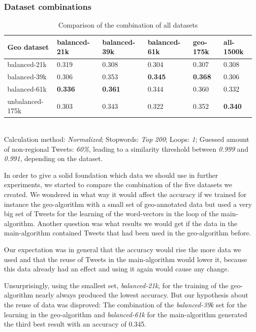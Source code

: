 \documentclass[./Main.tex]{subfiles}
\begin{document}
\subsubsection{Dataset combinations}
\label{dataset_section}
\begin{table}[b]
    \begin{tabular}{|l|lllll|}
    \hline
    Geo dataset     & balanced-21k & balanced-39k & balanced-61k & geo-175k & all-1500k \\ \hline
    balanced-21k    & 0.319        & 0.308        & 0.304        & 0.307           & 0.308       \\
    balanced-39k    & 0.306        & 0.353       & \textbf{0.345}        & \textbf{0.368 }          & 0.306       \\
    balanced-61k    & \textbf{0.336}        & \textbf{0.361}        & 0.344        &0.360           & 0.332       \\
    unbalanced-175k & 0.303        & 0.343        & 0.322        & 0.352           & \textbf{0.340}       \\ \hline
    \end{tabular} \\

  Calculation method: \textit{Normalized}; Stopwords: \textit{Top 200}; Loops: \textit{1}; Guessed amount of non-regional Tweets: \textit{60\%}, leading to a similarity threshold between \textit{0.999} and \textit{0.991}, depending on the dataset.
  \caption{Comparison of the combination of all datasets}
  \label{geo_datasets}
\end{table}

In order to give a solid foundation which data we should use in further experiments, we started to compare the combination of the five datasets we created. We wondered in what way it would affect the accuracy if we trained for instance the geo-algorithm with a small set of geo-annotated data but used a very big set of Tweets for the learning of the word-vectors in the loop of the main-algorithm. Another question was what results we would get if the data in the main-algorithm contained Tweets that had been used in the geo-algorithm before. 

Our expectation was in general that the accuracy would rise the more data we used and that the reuse of Tweets in the main-algorithm would lower it, because this data already had an effect and using it again would cause any change.

Unsurprisingly, using the smallest set, \emph{balanced-21k}, for the training of the geo-algorithm nearly always produced the lowest accuracy. 
But our hypothesis about the reuse of data was disproved: The combination of the \emph{balanced-39k} set for the learning in the geo-algorithm and \emph{balanced-61k} for the main-algorithm generated the third best result with an accuracy of 0.345.
\end{document}
